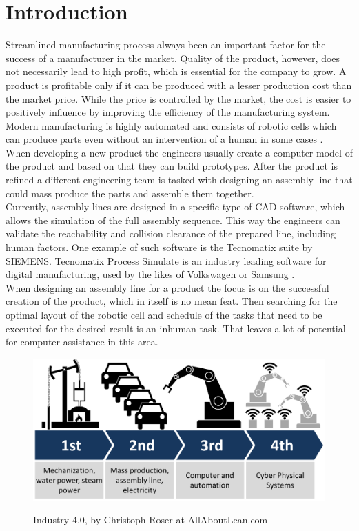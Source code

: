 \chapter{Introduction}
\label{ch:introduction}
\graphicspath{ {chapters/Introduction/} }

Streamlined manufacturing process always been an important factor for the success of a manufacturer in the market. 
Quality of the product, however, does not necessarily lead to high profit, which is essential for the company to grow. 
A product is profitable only if it can be produced with a lesser production cost than the market price. 
While the price is controlled by the market, the cost is easier to positively influence by improving the efficiency of the manufacturing system. 
Modern manufacturing is highly automated and consists of robotic cells which can produce parts even without an intervention of a human in some cases \cite{VirtualCommisioning}. \\

When developing a new product the engineers usually create a computer model of the product and based on that they can build prototypes. After the product is refined a different engineering team is tasked with designing an assembly line that could mass produce the parts and assemble them together. \\
 
Currently, assembly lines are designed in a specific type of CAD software, which allows the simulation of the full assembly sequence.
This way the engineers can validate the reachability and collision clearance of the prepared line, including human factors.
One example of such software is the Tecnomatix suite by SIEMENS. Tecnomatix Process Simulate is an industry leading software for digital manufacturing, used by the likes of Volkswagen or Samsung \cite{TecnomatixCustomers}. \\ 

When designing an assembly line for a product the focus is on the successful creation of the product, which in itself is no mean feat. 
Then searching for the optimal layout of the robotic cell and schedule of the tasks that need to be executed for the desired result is an inhuman task. That leaves a lot of potential for computer assistance in this area. \\ 

\begin{figure}[ht]
	\caption{Industry 4.0, by Christoph Roser at AllAboutLean.com}
	\centering
	  \includegraphics[width=1\textwidth]{industry-40.png}
	\label{fig:Industry40}
\end{figure}

